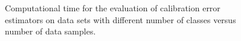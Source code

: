 \documentclass{article}
\begin{document}
\begin{figure}[!htbp]
  \begin{center}
    
    \caption{Computational time for the evaluation of calibration error estimators
      on data sets with different number of classes versus number of data samples.}
    \label{fig:timings}
  \end{center}
\end{figure}
\end{document}
